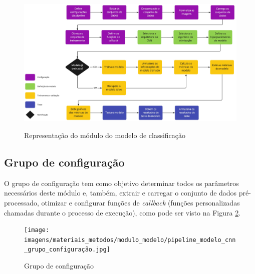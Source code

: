 \documentclass[
	12pt,				%
	oneside,			%
	a4paper,			%
	english,			%
	brazil				%
	]{abntex2ppgsi}
\begin{document}
\begin{figure}[H]
    \centering
    \caption{Representação do módulo do modelo de classificação}
    \includegraphics[width=1.0\textwidth]{imagens/materiais_metodos/modulo_modelo/pipeline_modelo_cnn.jpg}
    \label{fig:pipeline_model_cnn}
\end{figure}

\subsection{Grupo de configuração}
O grupo de configuração tem como objetivo determinar todos os parâmetros necessários deste módulo e, também, extrair e carregar o conjunto de dados pré-processado, otimizar e configurar funções de \textit{callback} (funções personalizadas chamadas durante o processo de execução), como pode ser visto na Figura \ref{fig:pipeline_modelo_cnn_grupo_configuração}.

\begin{figure}[H]
    \centering
    \caption{Grupo de configuração}
    \texttt{[image: imagens/materiais\_metodos/modulo\_modelo/pipeline\_modelo\_cnn\_grupo\_configuração.jpg]}
    \label{fig:pipeline_modelo_cnn_grupo_configuração}
\end{figure}
\end{document}
